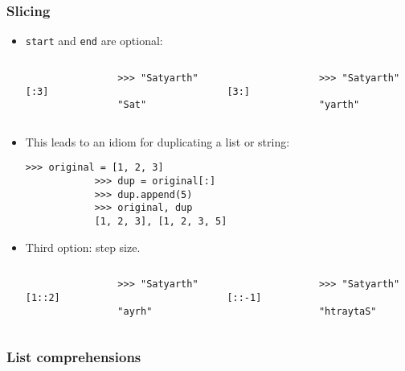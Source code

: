 \documentclass[notes]{beamer}
\begin{document}
	\begin{frame}[fragile]
		\frametitle{Slicing}
		
		\begin{itemize}
			\item \lstinline|start| and \lstinline|end| are optional:
			\begin{columns}[c]
				\begin{lstlisting}
				>>> "Satyarth"[:3]
				"Sat"
				\end{lstlisting}
				\begin{lstlisting}
				>>> "Satyarth"[3:]
				"yarth"
				\end{lstlisting}
			\end{columns}
			
			\pause
			
			\item This leads to an idiom for duplicating a list or string:
			\begin{lstlisting}[xleftmargin=\dimexpr-\leftmargini]
			>>> original = [1, 2, 3]
			>>> dup = original[:]
			>>> dup.append(5)
			>>> original, dup
			[1, 2, 3], [1, 2, 3, 5]
			\end{lstlisting}
			
			\pause
			
			\item Third option: step size.
			
			\begin{columns}[c]
				\begin{lstlisting}
				>>> "Satyarth"[1::2]
				"ayrh"
				\end{lstlisting}
				\begin{lstlisting}
				>>> "Satyarth"[::-1]
				"htraytaS"
				\end{lstlisting}
			\end{columns}
		\end{itemize}
		
	\end{frame}
	
	\begin{frame}[fragile]
		\frametitle{List comprehensions}
	\end{frame}
	
\end{document}
